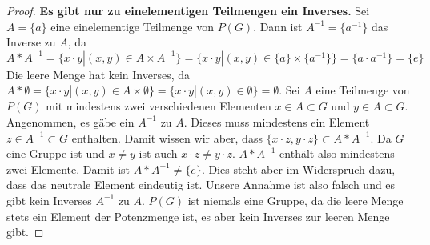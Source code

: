 \documentclass{article}
\begin{document}
\begin{proof}
		\textbf{Es gibt nur zu einelementigen Teilmengen ein Inverses.}
		Sei $A = \{a\}$ eine einelementige Teilmenge von $P(G)$. 
		Dann ist $A^{-1} = \{a^{-1}\}$ das Inverse zu $A$, da 
		\[A*A^{-1} = \{x\cdot y| (x,y)\in A \times A^{-1}\} = \{x\cdot y| (x,y) \in \{a\}\times \{a^{-1}\}\} = \{a \cdot a^{-1}\} = \{e\}\]
		Die leere Menge hat kein Inverses, da $A * \emptyset = \{x\cdot y| (x,y) \in A \times \emptyset\} = \{x\cdot y| (x,y) \in \emptyset\} = \emptyset$.
		Sei $A$ eine Teilmenge von $P(G)$ mit mindestens zwei verschiedenen Elementen $x\in A\subset G$ und $y\in A\subset G$. Angenommen, es gäbe ein $A^{-1}$ zu $A$. Dieses muss mindestens ein Element $z\in A^{-1}\subset G$ enthalten. Damit wissen wir aber, dass $\{x\cdot z, y\cdot z\}\subset A*A^{-1}$. Da $G$ eine Gruppe ist und $x\neq y$ ist auch $x\cdot z \neq y\cdot z$. $A*A^{-1}$ enthält also mindestens zwei Elemente. Damit ist $A*A^{-1}\neq \{e\}$. Dies steht aber im Widerspruch dazu, dass das neutrale Element eindeutig ist. Unsere Annahme ist also falsch und es gibt kein Inverses $A^{-1}$ zu $A$.
		$P(G)$ ist niemals eine Gruppe, da die leere Menge stets ein Element der Potenzmenge ist, es aber kein Inverses zur leeren Menge gibt. 
	\end{proof}
\end{document}
